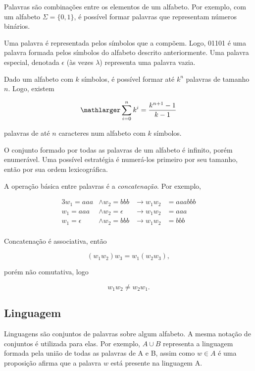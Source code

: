 \documentclass[a4paper,12pt,oneside,onecolumn]{uerj}
\begin{document}
Palavras são combinações entre os elementos de um alfabeto. Por exemplo, com um alfabeto $\Sigma = \{0, 1\}$, é possível formar palavras que representam números binários.

Uma palavra é representada pelos símbolos que a compõem. Logo, 01101 é uma palavra formada pelos símbolos do alfabeto descrito anteriormente. Uma palavra especial, denotada $\epsilon$ (às vezes $\lambda$) representa uma palavra vazia.

Dado um alfabeto com $k$ símbolos, é possível formar até $k^n$ palavras de tamanho $n$. Logo, existem

\begin{equation*}
	\mathlarger \sum^{n}_{i=0} k^i = \frac{k^{n+1}-1}{k-1}
\end{equation*}

palavras de até $n$ caracteres num alfabeto com $k$ símbolos.

O conjunto formado por todas as palavras de um alfabeto é infinito, porém enumerável. Uma possível estratégia é numerá-los primeiro por seu tamanho, então por sua ordem lexicográfica.

A operação básica entre palavras é a \emph{concatenação}. Por exemplo, 

\begin{alignat*}{3}
w_1 = aaa &\wedge w_2=bbb  &\rightarrow w_1w_2 &= aaabbb \\
w_1 = aaa &\wedge w_2=\epsilon  &\rightarrow w_1w_2 &= aaa \\
w_1 = \epsilon &\wedge w_2=bbb  &\rightarrow w_1w_2 &= bbb \\
\end{alignat*}

Concatenação é associativa, então 

\begin{equation*}
(w_1w_2)w_3 = w_1(w_2w_3),
\end{equation*}

porém não comutativa, logo

\begin{equation*}
w_1w_2 \neq w_2w_1.
\end{equation*}

\subsection{Linguagem}

Linguagens são conjuntos de palavras sobre algum alfabeto. A mesma notação de conjuntos é utilizada para elas. Por exemplo, $A \cup B$ representa a linguagem formada pela união de todas as palavras de A e B, assim como $w \in A$ é uma proposição afirma que a palavra $w$ está presente na linguagem A.
\end{document}

